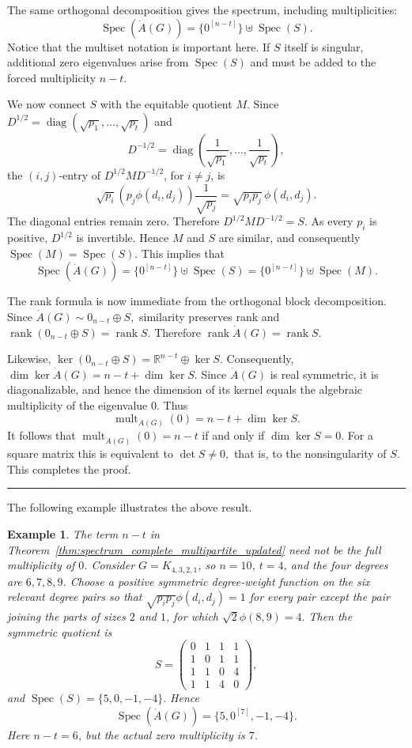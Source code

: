 \documentclass[12pt,twoside]{article}
\renewenvironment{proof}{{\noindent\bfseries Proof.}}{\qed}
\newcommand{\spec}{\operatorname{Spec}}
\newtheorem{example}[theorem]{Example}
\def\qed{\nolinebreak\hfill\rule{.2cm}{.2cm}\par\addvspace{.5cm}}
\begin{document}
\begin{proof}
	The same orthogonal decomposition gives the spectrum, including multiplicities:
	$$
	\spec(\dot A(G))
	=
	\{0^{[n-t]}\}\uplus\spec(S).
	$$
	Notice that the multiset notation is important here. If $S$ itself is singular, additional zero eigenvalues arise from $\spec(S)$ and must be added to the forced multiplicity $n-t$.
	
	We now connect $S$ with the equitable quotient $M$. Since
	$
	D^{1/2}
	=
	\operatorname{diag}(\sqrt{p_1},\ldots,\sqrt{p_t})
	$
	and
	$$
	D^{-1/2}
	=
	\operatorname{diag}
	\left(
	\frac{1}{\sqrt{p_1}},\ldots,
	\frac{1}{\sqrt{p_t}}
	\right),
	$$
	the $(i,j)$-entry of $D^{1/2}MD^{-1/2}$, for $i\neq j$, is
	$$
	\sqrt{p_i}
	\left(
	p_j\phi(d_i,d_j)
	\right)
	\frac{1}{\sqrt{p_j}}
	=
	\sqrt{p_ip_j}\,\phi(d_i,d_j).
	$$
	The diagonal entries remain zero. Therefore
	$
	D^{1/2}MD^{-1/2}=S.
	$
	As every $p_i$ is positive, $D^{1/2}$ is invertible. Hence $M$ and $S$ are similar, and consequently
	$
	\spec(M)=\spec(S).
	$
	This implies that
	$$
	\spec(\dot A(G))
	=
	\{0^{[n-t]}\}\uplus\spec(S)
	=
	\{0^{[n-t]}\}\uplus\spec(M).
	$$
	
	The rank formula is now immediate from the orthogonal block decomposition. Since
	$
	\dot A(G)\sim 0_{n-t}\oplus S,
	$
	similarity preserves rank and
	$
	\operatorname{rank}(0_{n-t}\oplus S)
	=
	\operatorname{rank}S.
	$
	Therefore
	$
	\operatorname{rank}\dot A(G)
	=
	\operatorname{rank}S.
	$
	
	Likewise,
	$
	\ker(0_{n-t}\oplus S)
	=
	\mathbb R^{n-t}\oplus\ker S.
	$
	Consequently,
	$
	\dim\ker\dot A(G)
	=
	n-t+\dim\ker S.
	$
	Since $\dot A(G)$ is real symmetric, it is diagonalizable, and hence the dimension of its kernel equals the algebraic multiplicity of the eigenvalue $0$. Thus
	$$
	\operatorname{mult}_{\dot A(G)}(0)
	=
	n-t+\dim\ker S.
	$$
	It follows that
	$
	\operatorname{mult}_{\dot A(G)}(0)=n-t
	$
	if and only if
	$
	\dim\ker S=0.
	$
	For a square matrix this is equivalent to
	$
	\det S\neq0,
	$
	that is, to the nonsingularity of $S$. This completes the proof.
\end{proof}


The following example illustrates the above result.
\begin{example}\label{ex:extra_zero_multipartite}
	The term $n-t$ in Theorem~\ref{thm:spectrum_complete_multipartite_updated} need not be the full multiplicity of $0$. Consider $G=K_{4,3,2,1}$, so $n=10$, $t=4$, and the four degrees are $6,7,8,9$. Choose a positive symmetric degree-weight function on the six relevant degree pairs so that
	$
	\sqrt{p_ip_j}\phi(d_i,d_j)=1
	$
	for every pair except the pair joining the parts of sizes $2$ and $1$, for which
	$
	\sqrt{2}\phi(8,9)=4.
	$
	Then the symmetric quotient is
	$$
	S=
	\begin{pmatrix}
		0&1&1&1\\
		1&0&1&1\\
		1&1&0&4\\
		1&1&4&0
	\end{pmatrix},
	$$
	and
	$
	\spec(S)=\{5,0,-1,-4\}.
	$
	Hence
	$$
	\spec(\dot A(G))=\{5,0^{[7]},-1,-4\}.
	$$
	Here $n-t=6$, but the actual zero multiplicity is $7$.
\end{example}
\end{document}
